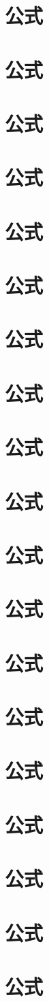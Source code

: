 \chapter{公式}
\chapter{公式}
\chapter{公式}
\chapter{公式}
\chapter{公式}
\chapter{公式}
\chapter{公式}
\chapter{公式}
\chapter{公式}
\chapter{公式}
\chapter{公式}
\chapter{公式}
\chapter{公式}
\chapter{公式}
\chapter{公式}
\chapter{公式}
\chapter{公式}
\chapter{公式}
\chapter{公式}



